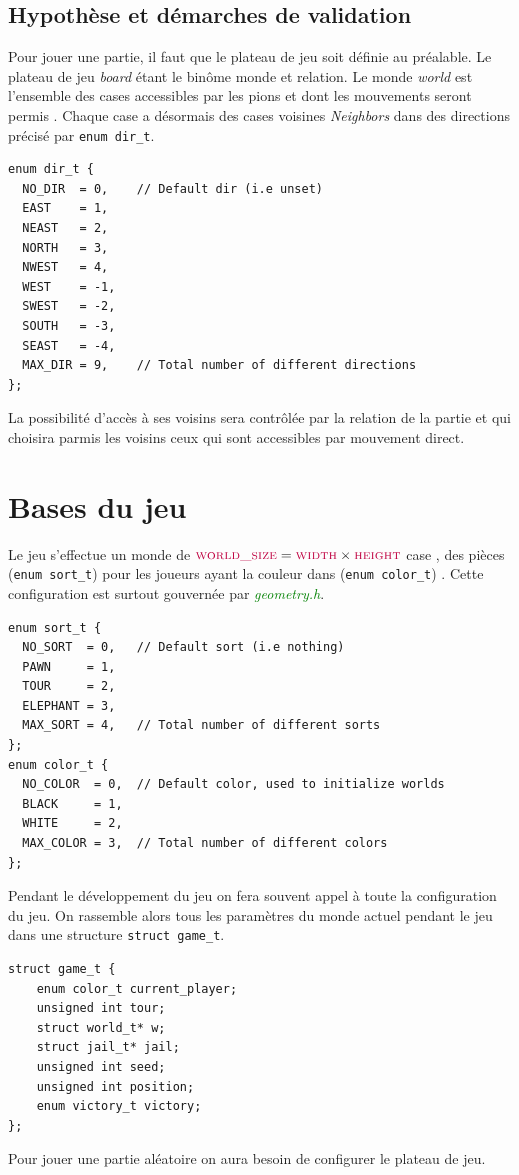 \documentclass[a4paper]{article}
\begin{document}
\subsection{Hypothèse et démarches de validation}
Pour jouer une partie, il faut que le plateau de jeu soit définie au préalable. Le plateau de jeu \textit{board}  étant 
le binôme monde et relation. 
Le monde \textit{world} est l’ensemble des cases accessibles par les pions et dont les mouvements seront permis . Chaque case a 
désormais des cases voisines \textit{Neighbors} dans des directions précisé par \lstinline|enum dir_t|.
\begin{lstlisting}
enum dir_t {
  NO_DIR  = 0,    // Default dir (i.e unset)
  EAST    = 1,
  NEAST   = 2,
  NORTH   = 3,
  NWEST   = 4,
  WEST    = -1,
  SWEST   = -2,
  SOUTH   = -3,
  SEAST   = -4,
  MAX_DIR = 9,    // Total number of different directions
};
\end{lstlisting}
La possibilité d’accès à ses voisins sera contrôlée par la relation de la partie et qui choisira parmis les voisins ceux qui sont
 accessibles par mouvement direct.  
\section{Bases du jeu}
Le jeu s’effectue un monde de $\textcolor{purple}{\textsc{world\_size}} = \textcolor{purple}{\textsc{width}} \times 
 \textcolor{purple}{\textsc{height}}$  case , des pièces (\lstinline|enum sort_t|) pour les joueurs ayant la couleur 
 dans (\lstinline|enum color_t|) . Cette configuration est surtout gouvernée par \textcolor{green}{\textit{geometry.h}}. \\
\begin{lstlisting}
enum sort_t {
  NO_SORT  = 0,   // Default sort (i.e nothing)
  PAWN     = 1,
  TOUR     = 2,
  ELEPHANT = 3,
  MAX_SORT = 4,   // Total number of different sorts
};
enum color_t {
  NO_COLOR  = 0,  // Default color, used to initialize worlds
  BLACK     = 1,
  WHITE     = 2,
  MAX_COLOR = 3,  // Total number of different colors 
};
\end{lstlisting}

Pendant le développement du jeu on fera souvent appel à toute la configuration du jeu. On rassemble alors tous les paramètres du monde
 actuel pendant le jeu dans une structure \lstinline|struct game_t|.
\begin{lstlisting}
struct game_t {
    enum color_t current_player;
    unsigned int tour;
    struct world_t* w;
    struct jail_t* jail;
    unsigned int seed;
    unsigned int position;
    enum victory_t victory;
};
\end{lstlisting}
Pour jouer une partie aléatoire on aura besoin de configurer le plateau de jeu.
\end{document}
